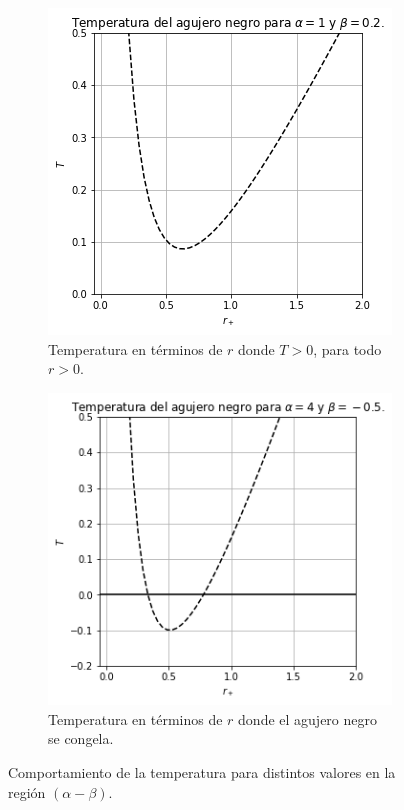 \begin{figure}[H]
    \centering
    \begin{subfigure}[b]{0.4\textwidth}
         \includegraphics[scale=0.5]{SoluciónEstática/Termodinámica/T(R)0.png}
         \caption{Temperatura en términos de $r$ donde $T>0$, para todo $r>0$.}
         \label{fig:T(r)static0}
     \end{subfigure}
     \begin{subfigure}[b]{0.4\textwidth}
         \includegraphics[scale=0.5]{SoluciónEstática/Termodinámica/T(r)1.png}
         \caption{Temperatura en términos de $r$ donde el agujero negro se congela.}
         \label{fig:T(r)static1}
     \end{subfigure}
    \label{fig:T(r)Static}
    \caption{Comportamiento de la temperatura para distintos valores en la región $(\alpha-\beta)$.}
\end{figure}


